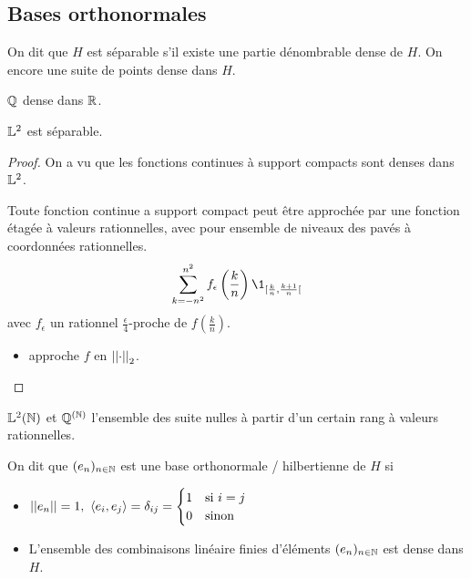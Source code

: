 \subsection{Bases orthonormales}


\begin{definition}
	On dit que $H$ est séparable s'il existe une partie dénombrable dense de $H$. On encore une suite de points dense dans $H$.
\end{definition}


\begin{example}
	$\mathbb{Q}$ dense dans $\mathbb{R}$.
\end{example}

\begin{example}
	$\mathbb{L}^2$ est séparable.
\end{example}

\begin{proof}
	On a vu que les fonctions continues à support compacts sont denses dans $\mathbb{L}^2$.


	Toute fonction continue a support compact peut être approchée par une fonction étagée à valeurs rationnelles,
	avec pour ensemble de niveaux des pavés à coordonnées rationnelles.
	$$ \sum_{k=-n^2}^{n^2} f_{\epsilon} \left(\frac k n\right) \1_{[\frac k n, \frac {k+1} n[} $$
	avec $f_{\epsilon}$ un rationnel $\frac {\epsilon} 4$-proche de $f\left(\frac k n\right)$.

	\begin{itemize}
		\item approche $f$ en $\left|\left|\cdot\right|\right|_2$.
	\end{itemize}

\end{proof}

\begin{example}
	$\mathbb{L}^2(\mathbb{N})$ et $\mathbb{Q}^{(\mathbb{N})}$ l'ensemble des suite nulles à partir d'un certain rang à valeurs rationnelles.
\end{example}

\begin{definition}
	On dit que $(e_n)_{n\in \mathbb{N}}$ est une base orthonormale / hilbertienne de $H$ si
	\begin{itemize}
		\item $\left|\left|e_n\right|\right| = 1, \ \left\langle e_i, e_j \right\rangle = \delta_{ij} = \begin{cases} 1 & \text{si } i=j \\ 0 & \text{sinon} \end{cases}$
		\item L'ensemble des combinaisons linéaire finies d'éléments $(e_n)_{n\in \mathbb{N}}$ est dense dans $H$.
	\end{itemize}
\end{definition}


